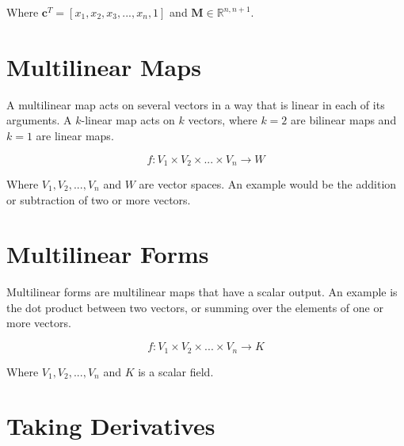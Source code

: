 Where $\mathbf{c}^T = \left[x_1,x_2,x_3,...,x_n,1\right]$ and $\mathbf{M} \in \mathbb{R}^{n,n+1}$.

\section{Multilinear Maps}

A multilinear map acts on several vectors in a way that is linear in each of its arguments. A $k$-linear map acts on $k$ vectors, where $k=2$ are bilinear maps and $k=1$ are linear maps.

\begin{equation}	
f: V_1 \times V_2 \times ... \times V_n \rightarrow W
\end{equation}

Where $V_1, V_2, ... , V_n$ and $W$ are vector spaces. An example would be the addition or subtraction of two or more vectors.

\section{Multilinear Forms}
Multilinear forms are multilinear maps that have a scalar output. An example is the dot product between two vectors, or summing over the elements of one or more vectors.

\begin{equation}
f: V_1 \times V_2 \times ... \times V_n \rightarrow K
\end{equation}

Where $V_1, V_2, ... , V_n$ and $K$ is a scalar field.


\section{Taking Derivatives}

